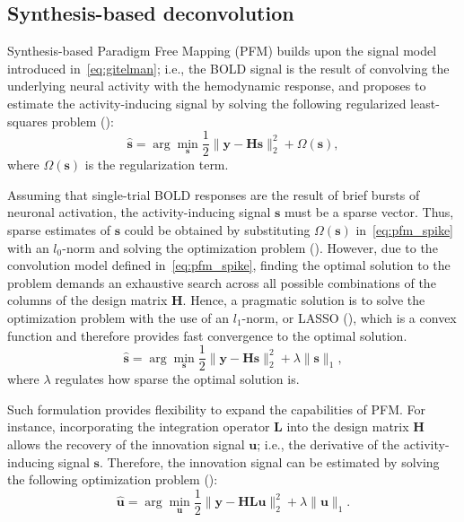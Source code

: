 
\subsection{Synthesis-based deconvolution}

Synthesis-based Paradigm Free Mapping (PFM) builds upon the signal model introduced in~\eqref{eq:gitelman}; i.e., the BOLD signal is the result of convolving the underlying neural activity with the hemodynamic response, and proposes to estimate the activity-inducing signal by solving the following regularized least-squares problem (\citealt{caballerogaudes2013ParadigmFreeMapping,urunuela2020StabilityBasedSparseParadigm,gaudes2011DetectionCharacterizationSingletrial}):
\begin{equation}
    \label{eq:pfm}
    \hat{\mathbf{s}} = \arg \min_{\mathbf{s}} \frac{1}{2} \| \mathbf{y} - \mathbf{Hs} \|_2^2 + \Omega(\mathbf{s}),
\end{equation}
where \(\Omega(\mathbf{s})\) is the regularization term.

Assuming that single-trial BOLD responses are the result of brief bursts of neuronal activation, the activity-inducing signal \(\mathbf{s}\) must be a sparse vector. Thus, sparse estimates of \(\mathbf{s}\) could be obtained by substituting \(\Omega(\mathbf{s})\) in~\eqref{eq:pfm_spike} with an \(l_0\)-norm and solving the optimization problem (\citealt{bruckstein2009SparseSolutionsSystems}). However, due to the convolution model defined in~\eqref{eq:pfm_spike}, finding the optimal solution to the problem demands an exhaustive search across all possible combinations of the columns of the design matrix \(\mathbf{H}\). Hence, a pragmatic solution is to solve the optimization problem with the use of an \(l_1\)-norm, or LASSO (\citealt{tibshirani1996RegressionShrinkageSelection}), which is a convex function and therefore provides fast convergence to the optimal solution.
\begin{equation}
    \label{eq:pfm_spike}
    \hat{\mathbf{s}} = \arg \min_{\mathbf{s}} \frac{1}{2} \| \mathbf{y} - \mathbf{Hs} \|_2^2 + \lambda \| \mathbf{s} \|_1,
\end{equation}
where \(\lambda\) regulates how sparse the optimal solution is.

Such formulation provides flexibility to expand the capabilities of PFM. For instance, incorporating the integration operator \(\mathbf{L}\) into the design matrix \(\mathbf{H}\) allows the recovery of the innovation signal \(\mathbf{u}\); i.e., the derivative of the activity-inducing signal \(\mathbf{s}\). Therefore, the innovation signal can be estimated by solving the following optimization problem (\citealt{cherkaoui2019SparsitybasedBlindDeconvolution,urunuela2020StabilityBasedSparseParadigm}):
\begin{equation}
    \label{eq:pfm_block}
    \hat{\mathbf{u}} = \arg \min_{\mathbf{u}} \frac{1}{2} \| \mathbf{y} - \mathbf{HLu} \|_2^2 + \lambda \| \mathbf{u} \|_1.
\end{equation}

